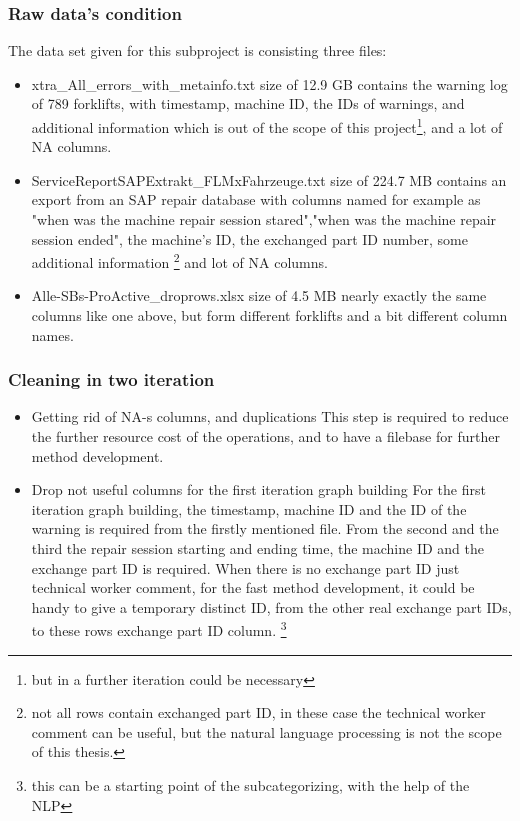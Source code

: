 		\subsubsection{Raw data's condition}
		The data set given for this subproject is consisting three files:
		\begin{itemize}
			\item{xtra\_All\_errors\_with\_metainfo.txt} size of 12.9 GB contains the warning log of 789 forklifts, with timestamp, machine ID, the IDs of warnings, and additional information which is out of the scope of this project\footnote{but in a further iteration could be necessary}, and a lot of NA columns.
			\item{ServiceReportSAPExtrakt\_FLMxFahrzeuge.txt} size of 224.7 MB contains an export from an SAP repair database with columns named for example as "when was the machine repair session stared","when was the machine repair session ended", the machine's ID, the exchanged part ID number, some additional information \footnote{not all rows contain exchanged part ID, in these case the technical worker comment can be useful, but the natural language processing is not the scope of this thesis.} and lot of NA columns.
			\item{Alle-SBs-ProActive\_droprows.xlsx} size of 4.5 MB nearly exactly the same columns like one above, but form different forklifts and a bit different column names.
		\end{itemize}
		\subsubsection{Cleaning in two iteration}
		\begin{itemize}
			\item{Getting rid of NA-s columns, and duplications} This step is required to reduce the further resource cost of the operations, and to have a filebase for further method development.
			\item{Drop not useful columns for the first iteration graph building} For the first iteration graph building, the timestamp, machine ID and the ID of the warning is required from the firstly mentioned file. From the second and the third the repair session starting and ending time, the machine ID and the exchange part ID is required. When there is no exchange part ID just technical worker comment, for the fast method development, it could be handy to give a temporary distinct ID, from the other real exchange part IDs, to these rows exchange part ID column. \footnote{this can be a starting point of the subcategorizing, with the help of the NLP} 
		\end{itemize}
